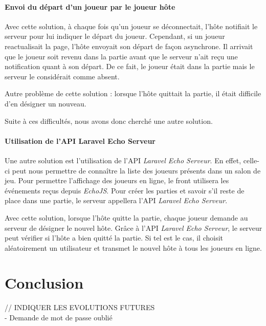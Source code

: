 \documentclass{tnreport}
\begin{document}
\subsubsection{Envoi du départ d'un joueur par le joueur hôte}

Avec cette solution, à chaque fois qu'un joueur se déconnectait, l'hôte notifiait le serveur pour lui indiquer le départ du joueur. Cependant, si un joueur reactualisait la page, l'hôte envoyait son départ de façon asynchrone. Il arrivait que le joueur soit revenu dans la partie avant que le serveur n'ait reçu une notification quant à son départ. De ce fait, le joueur était dans la partie mais le serveur le considérait comme absent.

Autre problème de cette solution : lorsque l'hôte quittait la partie, il était difficile d'en désigner un nouveau.

Suite à ces difficultés, nous avons donc cherché une autre solution.

\subsubsection{Utilisation de l'API Laravel Echo Serveur}

Une autre solution est l'utilisation de l'API \textit{Laravel Echo Serveur}. En effet, celle-ci peut nous permettre de connaître la liste des joueurs présents dans un salon de jeu. Pour permettre l'affichage des joueurs en ligne, le front utilisera les événements reçus depuis \textit{EchoJS}. Pour créer les parties et savoir s'il reste de place dans une partie, le serveur appellera l'API \textit{Laravel Echo Serveur}.

Avec cette solution, lorsque l'hôte quitte la partie, chaque joueur demande au serveur de désigner le nouvel hôte. Grâce à l'API \textit{Laravel Echo Serveur}, le serveur peut vérifier si l'hôte a bien quitté la partie. Si tel est le cas, il choisit aléatoirement un utilisateur et transmet le nouvel hôte à tous les joueurs en ligne.\\

\cleardoublepage

\chapter{Conclusion}

// INDIQUER LES EVOLUTIONS FUTURES \\
 - Demande de mot de passe oublié

\cleardoublepage
\end{document}
